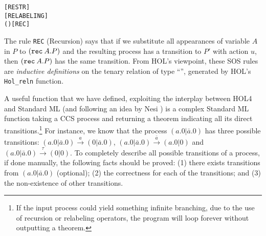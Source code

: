 \begin{alltt}
   \HOLSymConst{\ensuremath{\nu}}   \HOLTokenTransBegin{}\HOLTokenTransEnd \HOLSymConst{\ensuremath{\nu}}  \hfill\texttt{[RESTR]}
\HOLTokenTurnstile{}  \HOLTokenTransBegin{}\HOLTokenTransEnd {} \HOLSymConst{\HOLTokenImp{}}    \HOLTokenTransBegin{}  \HOLTokenTransEnd {}  \hfill\texttt{[RELABELING]}
\HOLTokenTurnstile{}   (  )  \HOLTokenTransBegin{}\HOLTokenTransEnd {} \HOLSymConst{\HOLTokenImp{}}    \HOLTokenTransBegin{}\HOLTokenTransEnd {}\hfill\texttt{[REC]}
\end{alltt}

The rule \texttt{REC} (Recursion)
 says that if we substitute all appearances of variable $A$ in $P$ to
$({\tt rec}\: A . P)$ and the resulting process has a transition to $P'$
with action $u$, then $({\tt rec}\: A . P)$ has the same
transition. From HOL's viewpoint, these
SOS rules are \emph{inductive 
  definitions} on the tenary relation  of type ``'', generated by HOL's 
\texttt{Hol_reln} function.

A useful function that we have defined, exploiting the interplay
between HOL4 and Standard ML (and following an idea by Nesi \cite{Nesi:1992ve})
 is a complex Standard ML function
  taking a CCS process and returning a theorem indicating all its
  direct transitions.\footnote{If the input process could yield
    something infinite branching, due to the use of recursion or
    relabeling operators, the program will loop forever without
    outputting a theorem.}
For instance, we know that the process $(a.0 | \bar{a}.0)$ has three
possible transitions: $(a.0 | \bar{a}.0) \overset{a}{\longrightarrow}
(0 | \bar{a}.0)$, $(a.0 | \bar{a}.0)
\overset{\bar{a}}{\longrightarrow} (a.0 | 0)$ and $(a.0 | \bar{a}.0)
\overset{\tau}{\longrightarrow} (0 | 0)$.
To completely describe all possible transitions of a process, if done manually, the
following facts should be proved: (1) there exists transitions from
$(a.0 | \bar{a}.0)$ (optional); (2) the correctness for each of the
transitions; and (3) the non-existence of other transitions.

